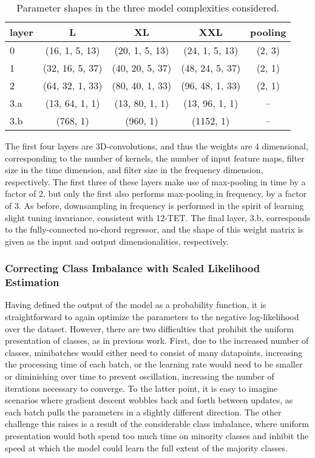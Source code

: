 \begin{table}[t]
\begin{center}
\caption{Parameter shapes in the three model complexities considered.}
\label{tab:lvce_archs}
\begin{tabular}{l | c | c | c | c }
layer & L & XL & XXL & pooling\\
\hline
0   & (16,  1, 5, 13) & (20,  1, 5, 13) & (24,  1, 5, 13) & (2, 3) \\
1   & (32, 16, 5, 37) & (40, 20, 5, 37) & (48, 24, 5, 37) & (2, 1) \\
2   & (64, 32, 1, 33) & (80, 40, 1, 33) & (96, 48, 1, 33) & (2, 1) \\
3.a & (13, 64, 1,  1) & (13, 80, 1,  1) & (13, 96, 1,  1) &   --   \\
3.b &    (768, 1)     &     (960, 1)    &    (1152, 1)    &   --   \\
\hline
\end{tabular}
\end{center}
\end{table}

The first four layers are 3D-convolutions, and thus the weights are 4 dimensional, corresponding to the number of kernels, the number of input feature maps, filter size in the time dimension, and filter size in the frequency dimension, respectively.
The first three of these layers make use of max-pooling in time by a factor of 2, but only the first also performs max-pooling in frequency, by a factor of 3.
As before, downsampling in frequency is performed in the spirit of learning slight tuning invariance, consistent with 12-TET.
The final layer, 3.b, corresponds to the fully-connected no-chord regressor, and the shape of this weight matrix is given as the input and output dimensionalities, respectively.


\subsubsection{Correcting Class Imbalance with Scaled Likelihood Estimation}
\label{subsubsec:scaled_likelihood_estimation}
Having defined the output of the model as a probability function, it is straightforward to again optimize the parameters to the negative log-likelihood over the dataset.
However, there are two difficulties that prohibit the uniform presentation of classes, as in previous work.
First, due to the increased number of classes, minibatches would either need to consist of many datapoints, increasing the processing time of each batch, or the learning rate would need to be smaller or diminishing over time to prevent oscillation, increasing the number of iterations necessary to converge.
To the latter point, it is easy to imagine scenarios where gradient descent wobbles back and forth between updates, as each batch pulls the parameters in a slightly different direction.
The other challenge this raises is a result of the considerable class imbalance, where uniform presentation would both spend too much time on minority classes and inhibit the speed at which the model could learn the full extent of the majority classes.

